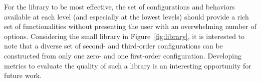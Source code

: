 \documentclass[graybox]{svmult}
\begin{document}
For the library to be most effective, the set of configurations and behaviors available
 at each level (and especially at the lowest levels) should provide a rich set of
 functionalities without presenting the user with an overwhelming number of options. 
 Considering the small library in Figure~\ref{fig:library},
 it is interested to note that a diverse set of second- and third-order configurations can
be constructed from only one zero- and one first-order configuration. Developing metrics to
evaluate the quality of such a library is an interesting opportunity for future work. 
%
\end{document}
